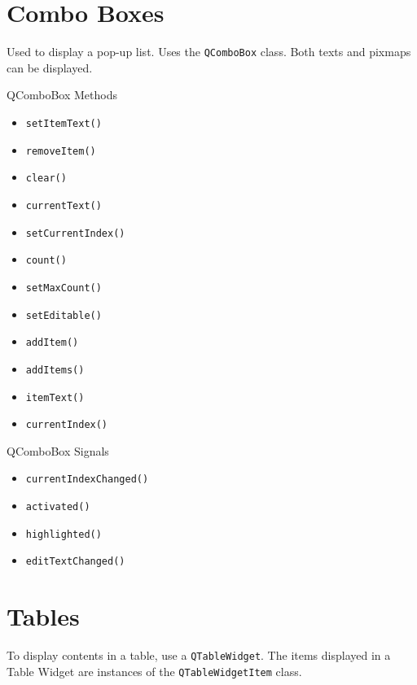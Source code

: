\documentclass[notes.tex]{subfiles}
\begin{document}
		\section{Combo Boxes}
			Used to display a pop-up list. Uses the \verb|QComboBox| class. Both texts and pixmaps can be displayed.
			\begin{sidenote}{QComboBox Methods}
				\vspace{-0.5cm}
				\begin{multicols}{3}
					\begin{itemize}[nosep]
						\item \verb|setItemText()|
						\item \verb|removeItem()|
						\item \verb|clear()|
						\item \verb|currentText()|
						\item \verb|setCurrentIndex()|
						\item \verb|count()|
						\item \verb|setMaxCount()|
						\item \verb|setEditable()|
						\item \verb|addItem()|
						\item \verb|addItems()|
						\item \verb|itemText()|
						\item \verb|currentIndex()|
					\end{itemize}
				\end{multicols}
			\end{sidenote}
			\begin{sidenote}{QComboBox Signals}
				\vspace{-0.5cm}
				\begin{multicols}{2}
					\begin{itemize}[nosep]
						\item \verb|currentIndexChanged()|
						\item \verb|activated()|
						\item \verb|highlighted()|
						\item \verb|editTextChanged()|
					\end{itemize}
				\end{multicols}
			\end{sidenote}

		\section{Tables}
			To display contents in a table, use a \verb|QTableWidget|. The items displayed in a Table Widget are instances of the \verb|QTableWidgetItem| class.
\end{document}
